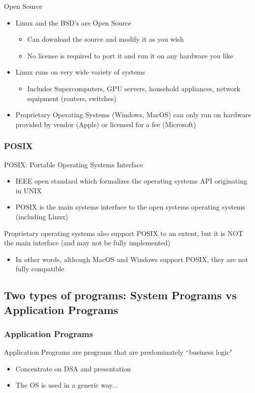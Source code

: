 Open Source
\begin{itemize}
    \item Linux and the BSD's are Open Source
    \begin{itemize}
        \item Can download the source and modify it as you wish
        \item No license is required to port it and run it on any hardware you like
    \end{itemize}
    \item Linux runs on very wide variety of systems
    \begin{itemize}
        \item Includes Supercomputers, GPU servers, household appliances, network equipment (routers, switches)
    \end{itemize}
    \item Proprietary Operating Systems (Windows, MacOS) can only run on hardware provided by vendor (Apple) or licensed for a fee (Microsoft)
\end{itemize}

\subsubsection{POSIX}
POSIX: Portable Operating Systems Interface
\begin{itemize}
    \item IEEE open standard which formalizes the operating systems API originating in UNIX
    \item POSIX is the main systems interface to the open systems operating systems (including Linux)
\end{itemize}
Proprietary operating systems also support POSIX to an extent, but it is NOT the main interface (and may not be fully implemented)
\begin{itemize}
    \item In other words, although MacOS and Windows support POSIX, they are not fully compatible
\end{itemize}
\subsection{Two types of programs: System Programs vs Application Programs}
\subsubsection{Application Programs}
Application Programs are programs that are predominately ``business logic"
\begin{itemize}
    \item Concentrate on DSA and presentation
    \item The OS is used in a generic way...
\end{itemize}

